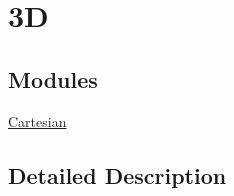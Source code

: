 \hypertarget{group___e_g_x_math-_conversions-_coordinate_conversions-3_d}{}\section{3D}
\label{group___e_g_x_math-_conversions-_coordinate_conversions-3_d}
\subsection*{Modules}
\begin{DoxyCompactItemize}
\item 
\mbox{\hyperlink{group___e_g_x_math-_conversions-_coordinate_conversions-3_d-_cartesian}{Cartesian}}
\end{DoxyCompactItemize}


\subsection{Detailed Description}
